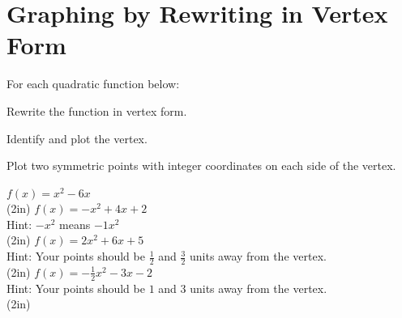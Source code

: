 \section*{Graphing by Rewriting in Vertex Form}
For each quadratic function below:
\begin{clist}
\item Rewrite the function in vertex form.
\item Identify and plot the vertex.
\item Plot two symmetric points with integer coordinates on each side of the vertex.
\end{clist}
\begin{smenum}
\mitemxx
{$f(x)=x^2-6x$\\[1ex]\GridSquareFitEO[10](2in)}
{$f(x)=-x^2+4x+2$\\Hint: $-x^2$ means $-1x^2$\\[1ex]\GridSquareFitEO[10](2in)}
\mitemxx
{$f(x)=2x^2+6x+5$\\Hint: Your points should be $\frac{1}{2}$ and $\frac{3}{2}$ units away from the vertex.\\[1ex]\GridSquareFitEO[10](2in)}
{$f(x)=-\frac{1}{2}x^2-3x-2$\\Hint: Your points should be $1$ and $3$ units away from the vertex.\\[1ex]\GridSquareFitEO[10](2in)}
\end{smenum}

